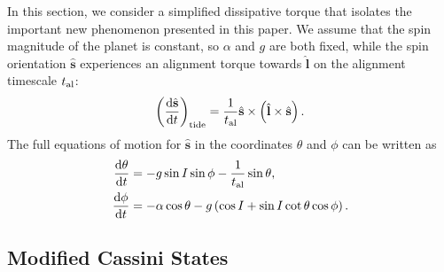 \documentclass[
        fleqn,
        usenatbib,
        referee
    ]{mnras}
\newcommand*{\rd}[2]{\frac{\mathrm{d}#1}{\mathrm{d}#2}}
\newcommand*{\p}[1]{\left(#1\right)}
\newcommand*{\uv}[1]{\hat{\boldsymbol{\mathbf{#1}}}}
\begin{document}
In this section, we consider a simplified dissipative torque that isolates the
important new phenomenon presented in this paper. We assume that the spin
magnitude of the planet is constant, so $\alpha$ and $g$ are both fixed, while
the spin orientation $\uv{s}$ experiences an alignment torque towards $\uv{l}$
on the alignment timescale $t_{\rm al}$:
\begin{equation}
    \p{\rd{\uv{s}}{t}}_{\rm tide}
        = \frac{1}{t_{\rm al}} \uv{s} \times \p{\uv{l} \times \uv{s}}.
        \label{eq:dsdt_tide_toy}
\end{equation}
The full equations of motion for $\uv{s}$ in the coordinates $\theta$ and $\phi$
can be written as
\begin{align}
    \rd{\theta}{t} &= -g\sin I \sin \phi - \frac{1}{t_{\rm al}} \sin \theta,
        \label{eq:dqdt_toy}\\
    \rd{\phi}{t} &= -\alpha \cos\theta
        - g\p{\cos I + \sin I \cot \theta \cos \phi}.\label{eq:dfdt_toy}
\end{align}

\subsection{Modified Cassini States}\label{ss:mcs}
\end{document}
